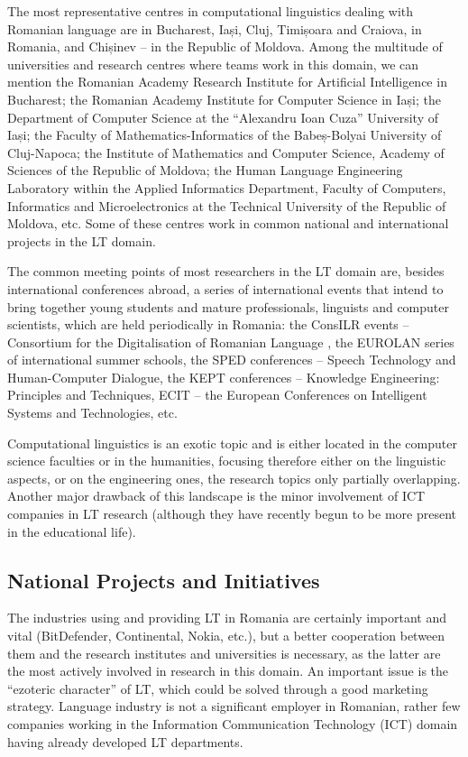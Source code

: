 \begin{multicols}{2}
The most representative centres in computational linguistics dealing with Romanian language are in Bucharest, Iași, Cluj, Timișoara and Craiova, in Romania, and Chișinev -- in the Republic of Moldova. Among the multitude of universities and research centres where teams work in this domain, we can mention the Romanian Academy Research Institute for Artificial Intelligence in Bucharest; the Romanian Academy Institute for Computer Science in Iași; the Department of Computer Science at the “Alexandru Ioan Cuza” University of Iași; the Faculty of Mathematics-Informatics of the Babeș-Bolyai University of Cluj-Napoca; the Institute of Mathematics and Computer Science, Academy of Sciences of the Republic of Moldova; the Human Language Engineering Laboratory within the Applied Informatics Department, Faculty of Computers, Informatics and Microelectronics at the Technical University of the Republic of Moldova, etc. Some of these centres work in common national and international projects in the LT domain. 

The common meeting points of most researchers in the LT domain are, besides international conferences abroad, a series of international events that intend to bring together young students and mature professionals, linguists and computer scientists, which are held periodically in Romania: the ConsILR events -- Consortium for the Digitalisation of Romanian Language \cite{consilr}, the EUROLAN series of international summer schools, the SPED conferences -- Speech Technology and Human-Computer Dialogue, the KEPT conferences -- Knowledge Engineering: Principles and Techniques, ECIT -- the European Conferences on Intelligent Systems and Technologies, etc.

Computational linguistics is an exotic topic and is either located in the computer science faculties or in the humanities, focusing therefore either on the linguistic aspects, or on the engineering ones, the research topics only partially overlapping. Another major drawback of this landscape is the minor involvement of ICT companies in LT research (although they have recently begun to be more present in the educational life).

\subsection{National Projects and Initiatives}

The industries using and providing LT in Romania are certainly important and vital (BitDefender, Continental, Nokia, etc.), but a better cooperation between them and the research institutes and universities is necessary, as the latter are the most actively involved in research in this domain. An important issue is the ``ezoteric character'' of LT, which could be solved through a good marketing strategy. Language industry is not a significant employer in Romanian, rather few companies working in the Information Communication Technology (ICT) domain having already developed LT departments.


\end{multicols}
